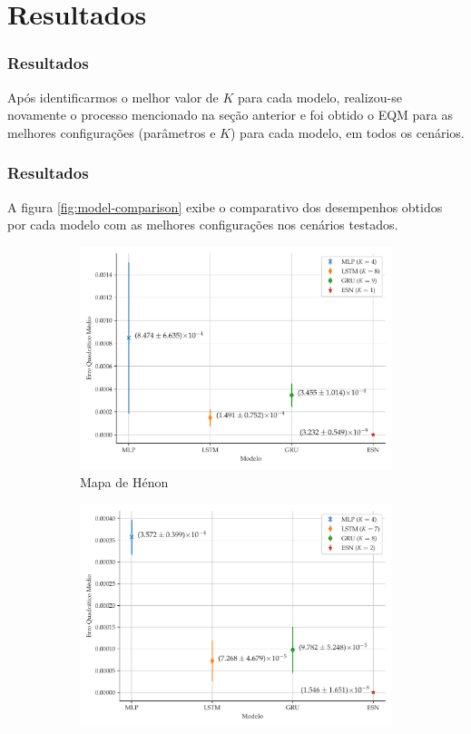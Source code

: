 \documentclass[aspectratio=169]{beamer}
\begin{document}
\section{Resultados}

\begin{frame}
\frametitle{Resultados}
\justifying Após identificarmos o melhor valor de $K$ para cada modelo, realizou-se novamente o processo mencionado na seção anterior e foi obtido o EQM para as melhores configurações (parâmetros e $K$) para cada modelo, em todos os cenários. 
\end{frame}

\begin{frame}
\frametitle{Resultados}
\justifying A figura \ref{fig:model-comparison} exibe o comparativo dos desempenhos obtidos por cada modelo com as melhores configurações nos cenários testados.
\begin{figure}[!h]
     \begin{subfigure}[t]{0.4\textwidth}
     	\centering
         \includegraphics[scale=0.15]{comparacao-k-henon.pdf}
         \caption{Mapa de Hénon}
     \end{subfigure}
     \centering
     \begin{subfigure}[t]{0.4\textwidth} 
     \centering
         \includegraphics[scale=0.15]{comparacao-k-logistic.pdf}

\end{subfigure}
\end{figure}
\end{frame}
\end{document}

